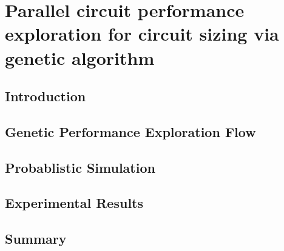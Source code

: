 
\chapter{Parallel circuit performance exploration for circuit sizing via genetic algorithm}\label{chap:PAGE}
  \section{Introduction}\label{sec:PAGEIntro}
  \section{Genetic Performance Exploration Flow}\label{sec:GPEF}
  \section{Probablistic Simulation}\label{sec:ProbSimu}
  \section{Experimental Results}\label{sec:PAGEExp}
  \section{Summary}\label{sec:PAGESum}
